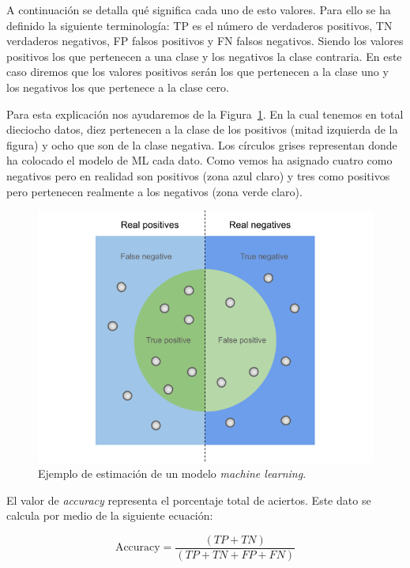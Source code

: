 \documentclass[a4paper, 12pt]{book}
\begin{document}
A continuación se detalla qué significa cada uno de esto valores. Para ello se ha definido la siguiente terminología: TP es el número de verdaderos positivos, TN verdaderos negativos, FP falsos positivos y FN falsos negativos. Siendo los valores positivos los que pertenecen a una clase y los negativos la clase contraria. En este caso diremos que los valores positivos serán los que pertenecen a la clase uno y los negativos los que pertenece a la clase cero. 

Para esta explicación nos ayudaremos de la Figura~\ref{fig:explicacion_acc}. En la cual tenemos en total dieciocho datos, diez pertenecen a la clase de los positivos (mitad izquierda de la figura) y ocho que son de la clase negativa. Los círculos grises representan donde ha colocado el modelo de ML cada dato. Como vemos ha asignado cuatro como negativos pero en realidad son positivos (zona azul claro) y tres como positivos pero pertenecen realmente a los negativos (zona verde claro).

\begin{figure}[htb]
  \centering
  \includegraphics[width=12cm, keepaspectratio]{img/explicacion_acc.png}
  \caption{Ejemplo de estimación de un modelo \textit{machine learning}.}\label{fig:explicacion_acc}
\end{figure}

El valor de \textit{accuracy} representa el porcentaje total de aciertos. Este dato se calcula por medio de la siguiente ecuación:

\begin{equation}
 \boxed{\mbox{Accuracy} = \frac{(TP + TN)}{(TP + TN + FP + FN)}}
\end{equation}
\end{document}
